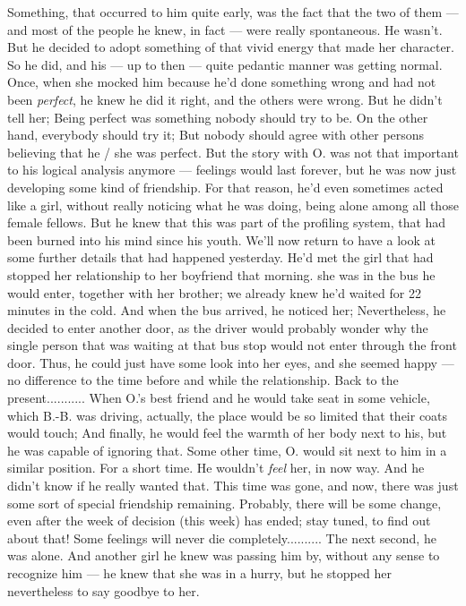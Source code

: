 Something, that occurred to him quite early, was the fact that the two of them --- and most of the people he knew, in fact --- were really spontaneous. 
He wasn't. 
But he decided to adopt something of that vivid energy that made her character. 
So he did, and his --- up to then --- quite pedantic manner was getting normal. 
Once, when she mocked him because he'd done something wrong and had not been \emph{perfect}, he knew he did it right, and the others were wrong. But he didn't tell her; Being perfect was something nobody should try to be. 
On the other hand, everybody should try it; But nobody should agree with other persons believing that he / she was perfect. 
But the story with O. was not that important to his logical analysis anymore --- feelings would last forever, but he was now just developing some kind of friendship. 
For that reason, he'd even sometimes acted like a girl, without really noticing what he was doing, being alone among all those female fellows. 
But he knew that this was part of the profiling system, that had been burned into his mind since his youth. 
We'll now return to have a look at some further details that had happened yesterday. 
He'd met the girl that had stopped her relationship to her boyfriend that morning. 
she was in the bus he would enter, together with her brother; we already knew he'd waited for 22 minutes in the cold. 
And when the bus arrived, he noticed her; Nevertheless, he decided to enter another door, as the driver would probably wonder why the single person that was waiting at that bus stop would not enter through the front door. 
Thus, he could just have some look into her eyes, and she seemed happy --- no difference to the time before and while the relationship. 
Back to the present...........
When O.'s best friend and he would take seat in some vehicle, which B.-B. was driving, actually, the place would be so limited that their coats would touch; And finally, he would feel the warmth of her body next to his, but he was capable of ignoring that. 
Some other time, O. would sit next to him in a similar position. 
For a short time. 
He wouldn't \emph{feel} her, in now way. 
And he didn't know if he really wanted that. 
This time was gone, and now, there was just some sort of special friendship remaining. 
Probably, there will be some change, even after the week of decision (this week) has ended; stay tuned, to find out about that!
Some feelings will never die completely..........
The next second, he was alone. 
And another girl he knew was passing him by, without any sense to recognize him --- he knew that she was in a hurry, but he stopped her nevertheless to say goodbye to her. 
